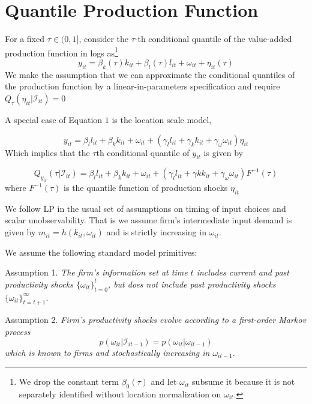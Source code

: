 \documentclass[11pt]{article}
\begin{document}
\section{Quantile Production Function\label{sec:OP-and-LP}}
For a fixed $\tau \in (0, 1]$, consider the $\tau$-th conditional quantile of the value-added production function in logs as\footnote{We drop the constant term $\beta_{0}(\tau)$ and let $\omega_{it}$
subsume it because it is not separately identified without location
normalization on $\omega_{it}$.}
\begin{equation}
    y_{it}=\beta_{k}(\tau)k_{it}+\beta_{l}(\tau)l_{it}+\omega_{it}+\eta_{it}(\tau)
\end{equation}
We make the assumption that we can approximate the conditional quantiles of the production function by a linear-in-parameters specification and require $Q_{\tau}(\eta_{it}|\mathcal{I}_{it})=0$

A special case of Equation $1$ is the location scale model,

\begin{equation}
    y_{it}=\beta_{l}l_{it}+\beta_{k}k_{it}+\omega_{it}+(\gamma_{l}l_{it}+\gamma_{k}k_{it}+\gamma_{\omega}\omega_{it})\eta_{it}
\end{equation}
Which implies that the $\tau$th conditional quantile of $y_{it}$ is given by

\begin{equation}
Q_{y_{it}}(\tau|\mathcal{I}_{it})=\beta_{l}l_{it}+\beta_{k}k_{it}+\omega_{it}+(\gamma_{l}l_{it}+\gamma{k}k_{it}+\gamma_{\omega}\omega_{it})F^{-1}(\tau)
\end{equation}
where $F^{-1}(\tau)$ is the quantile function of production shocks $\eta_{it}$

We follow LP in the usual set of assumptions on timing of input choices and scalar unobservability. That is we assume firm's intermediate input demand is given by $m_{it}=h(k_{it}, \omega_{it})$ and is strictly increasing in $\omega_{it}$.

We assume the following standard model primitives:

Assumption 1. \textit{The firm's information set at time $t$ includes current and past productivity shocks $\{\omega_{it}\}_{t=0}^{t}$, but does not include past productivity shocks} $\{\omega_{it}\}_{t=t+1}^{\infty}$.

Assumption 2. \textit{Firm's productivity shocks evolve according to a first-order Markov process}
\begin{equation}
p(\omega_{it}|\mathcal{I}_{it-1})=p(\omega_{it}|\omega_{it-1})
\end{equation}
\textit{which is known to firms and stochastically increasing in $\omega_{it-1}$}.
\end{document}

